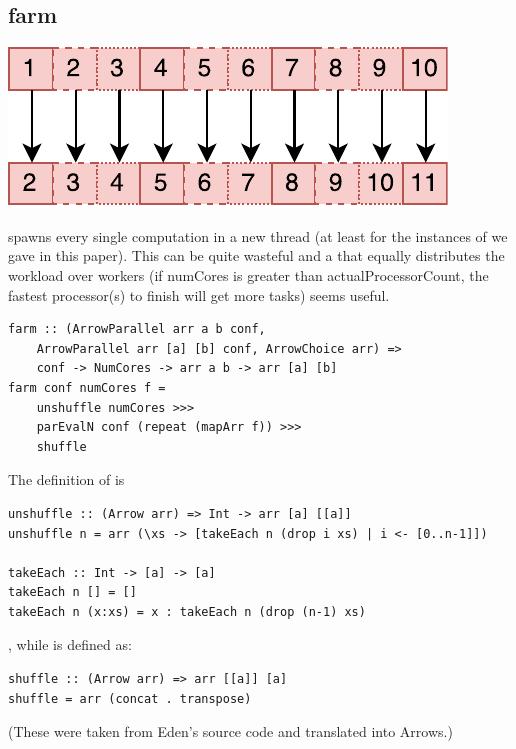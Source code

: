 \subsection{farm}
\begin{center}
	\includegraphics[scale=0.7]{images/farm}
\end{center}
 spawns every single computation in a new thread (at least for the instances of  we gave in this paper). This can be quite wasteful and a  that equally distributes the workload over  workers (if numCores is greater than actualProcessorCount, the fastest processor(s) to finish will get more tasks) seems useful.
\begin{lstlisting}[frame=htrbl]
farm :: (ArrowParallel arr a b conf,
	ArrowParallel arr [a] [b] conf, ArrowChoice arr) =>
	conf -> NumCores -> arr a b -> arr [a] [b]
farm conf numCores f =
	unshuffle numCores >>>
	parEvalN conf (repeat (mapArr f)) >>>
	shuffle
\end{lstlisting}
The definition of  is
\begin{lstlisting}[frame=htrbl]
unshuffle :: (Arrow arr) => Int -> arr [a] [[a]]
unshuffle n = arr (\xs -> [takeEach n (drop i xs) | i <- [0..n-1]])

takeEach :: Int -> [a] -> [a]
takeEach n [] = []
takeEach n (x:xs) = x : takeEach n (drop (n-1) xs)
\end{lstlisting}
, while  is defined as:
\begin{lstlisting}[frame=htrbl]
shuffle :: (Arrow arr) => arr [[a]] [a]
shuffle = arr (concat . transpose)
\end{lstlisting}
(These were taken from Eden's source code \cite{eden_skel_shuffle} and translated into Arrows.)

